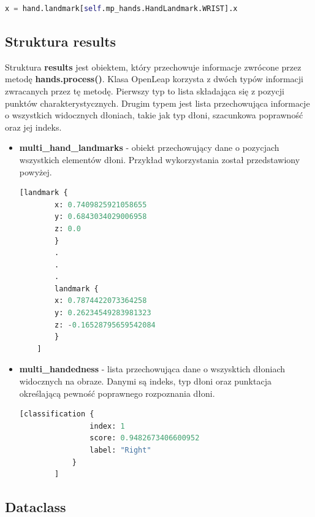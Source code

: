 \begin{lstlisting}[language=python, style=programming, caption={Przykładowe wykorzystanie \textbf{mp\_hands}},captionpos=b, label={lst:enum}]
    x = hand.landmark[self.mp_hands.HandLandmark.WRIST].x
\end{lstlisting}


\subsection{Struktura results}

\quad Struktura \textbf{results} jest obiektem, który przechowuje informacje zwrócone przez metodę \textbf{hands.process()}. Klasa OpenLeap korzysta z dwóch typów informacji zwracanych przez tę metodę. Pierwszy typ to lista składająca się z pozycji punktów charakterystycznych. Drugim typem jest lista przechowująca informacje o wszystkich widocznych dłoniach, takie jak typ dłoni, szacunkowa poprawność oraz jej indeks.   

\begin{itemize}
    \item \textbf{multi\_hand\_landmarks} - obiekt przechowujący dane o pozycjach wszystkich elementów dłoni. Przykład wykorzystania został przedstawiony powyżej. 
    
    \begin{lstlisting}[caption={Przykład elementu obiektu},captionpos=b,language=python, style=command]
    [landmark {
        x: 0.7409825921058655
        y: 0.6843034029006958
        z: 0.0
        }
        .
        .
        .
        landmark {
        x: 0.7874422073364258
        y: 0.26234549283981323
        z: -0.16528795659542084
        }
    ]
    \end{lstlisting}
    

    \item \textbf{multi\_handedness} - lista przechowująca dane o wszysktich dłoniach widocznych na obraze. Danymi są indeks, typ dłoni oraz punktacja określającą pewność poprawnego rozpoznania dłoni. 
    \begin{lstlisting}[caption={Przykład elementu obiektu},captionpos=b,language=python,style=command]
        [classification {
                index: 1
                score: 0.9482673406600952
                label: "Right"
            }
        ]
    \end{lstlisting}
\end{itemize}

\subsection{Dataclass}

